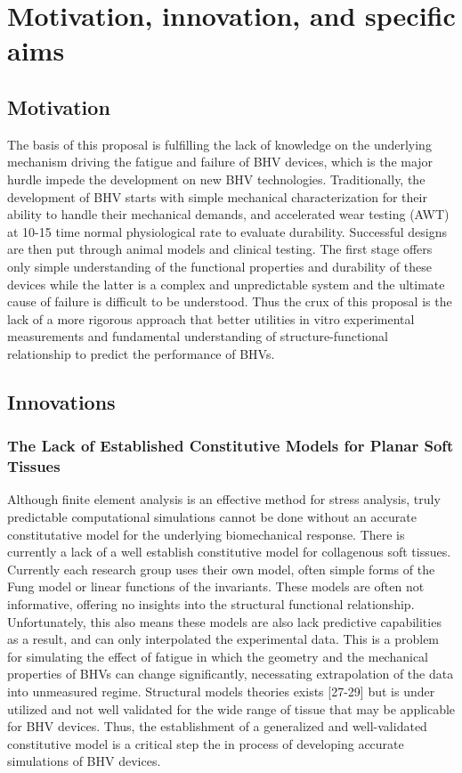 \section{Motivation, innovation, and specific aims}

\subsection{Motivation}
    The basis of this proposal is fulfilling the lack of knowledge on the underlying mechanism driving the fatigue and failure of BHV devices, which is the major hurdle impede the development on new BHV technologies. Traditionally, the development of BHV starts with simple mechanical characterization for their ability to handle their mechanical demands, and accelerated wear testing (AWT) at 10-15 time normal physiological rate to evaluate durability. Successful designs are then put through animal models and clinical testing. The first stage offers only simple understanding of the functional properties and durability of these devices while the latter is a complex and unpredictable system and the ultimate cause of failure is difficult to be understood. Thus the crux of this proposal is the lack of a more rigorous approach that better utilities in vitro experimental measurements and fundamental understanding of structure-functional relationship to predict the performance of BHVs.

\subsection{Innovations}
\subsubsection{The Lack of Established Constitutive Models for Planar Soft Tissues}
    Although finite element analysis is an effective method for stress analysis, truly predictable computational simulations cannot be done without an accurate constitutative model for the underlying biomechanical response. There is currently a lack of a well establish constitutive model for collagenous soft tissues. Currently each research group uses their own model, often simple forms of the Fung model or linear functions of the invariants. These models are often not informative, offering no insights into the structural functional relationship. Unfortunately, this also means these models are also lack predictive capabilities as a result, and can only interpolated the experimental data. This is a problem for simulating the effect of fatigue in which the geometry and the mechanical properties of BHVs can change significantly, necessating extrapolation of the data into unmeasured regime. Structural models theories exists [27-29] but is under utilized and not well validated for the wide range of tissue that may be applicable for BHV devices. Thus, the establishment of a generalized and well-validated constitutive model is a critical step the in process of developing accurate simulations of BHV devices.

